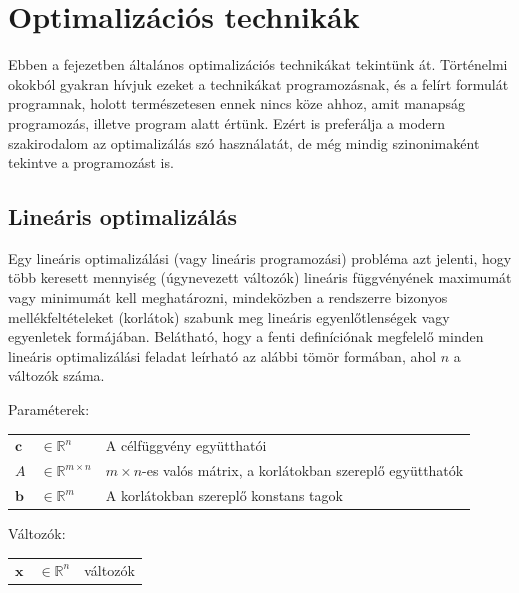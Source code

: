 
\chapter{Optimalizációs technikák}\label{chap:optimalization}
Ebben a fejezetben általános optimalizációs technikákat tekintünk át. Történelmi okokból gyakran hívjuk ezeket a technikákat programozásnak, és a felírt formulát programnak, holott természetesen ennek nincs köze ahhoz, amit manapság programozás, illetve program alatt értünk. Ezért is preferálja a modern szakirodalom az optimalizálás szó használatát, de még mindig szinonimaként tekintve a programozást is.

\section{Lineáris optimalizálás}\label{sec:LP}

Egy lineáris optimalizálási (vagy lineáris programozási) probléma  azt jelenti, hogy több keresett mennyiség (úgynevezett változók) lineáris függvényének maximumát vagy minimumát kell meghatározni, mindeközben a rendszerre bizonyos mellékfeltételeket (korlátok) szabunk meg lineáris egyenlőtlenségek vagy egyenletek formájában.
Belátható, hogy a fenti definíciónak megfelelő minden lineáris optimalizálási feladat leírható az alábbi tömör formában, ahol $n$ a változók száma.

Paraméterek:

\begin{tabular}{lll}
	$\mathbf{c}$ & $\in \mathbb{R}^n$   & A célfüggvény együtthatói \\
	$A$ & $\in \mathbb{R}^{m×n}$  & $m × n$-es valós mátrix, a korlátokban szereplő együtthatók \\
	$\mathbf{b}$ & $\in \mathbb{R}^m$   & A korlátokban szereplő konstans tagok \\
\end{tabular}

Változók:

\begin{tabular}{lll}
	$\mathbf{x}$ & $\in \mathbb{R}^n$ & változók \\
\end{tabular}

